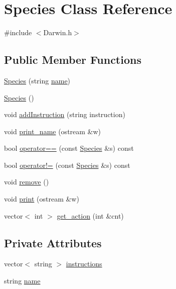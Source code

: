 \hypertarget{classSpecies}{\section{Species Class Reference}
\label{classSpecies}
}


{\ttfamily \#include $<$Darwin.\-h$>$}

\subsection*{Public Member Functions}
\begin{DoxyCompactItemize}
\item 
\hyperlink{classSpecies_acb1a44223d3184e2a5a8665478161c5a}{Species} (string \hyperlink{classSpecies_a11ce4c16866b4947d520bae7fd84cbfb}{name})
\item 
\hyperlink{classSpecies_abb0f8e3208b0cc676157b7dff837c0be}{Species} ()
\item 
void \hyperlink{classSpecies_a6b1195ac05cdf7da5ea5f495720da7a5}{add\-Instruction} (string instruction)
\item 
void \hyperlink{classSpecies_a1ddb5ea9243d57c8fd928fad06c70214}{print\-\_\-name} (ostream \&w)
\item 
bool \hyperlink{classSpecies_a58da6e8794203207cf9ba12268994c75}{operator==} (const \hyperlink{classSpecies}{Species} \&s) const 
\item 
bool \hyperlink{classSpecies_a157bafab6fa380101e4ca0a66fcb4950}{operator!=} (const \hyperlink{classSpecies}{Species} \&s) const 
\item 
void \hyperlink{classSpecies_af39b75705c4426214bb942d8d00eec2a}{remove} ()
\item 
void \hyperlink{classSpecies_a7965ec422f22b8a7636ed6479c8288f2}{print} (ostream \&w)
\item 
vector$<$ int $>$ \hyperlink{classSpecies_abddf118370d4b42524bc04dd8c588dcb}{get\-\_\-action} (int \&cnt)
\end{DoxyCompactItemize}
\subsection*{Private Attributes}
\begin{DoxyCompactItemize}
\item 
vector$<$ string $>$ \hyperlink{classSpecies_a2967f1f40745dd4f0b35f837cfaa33a6}{instructions}
\item 
string \hyperlink{classSpecies_a11ce4c16866b4947d520bae7fd84cbfb}{name}
\end{DoxyCompactItemize}
